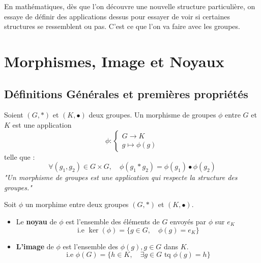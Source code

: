 
\minitoc  %

En mathématiques, dès que l'on découvre une nouvelle structure particulière, on essaye de définir des applications dessus 
pour essayer de voir si certaines structures se ressemblent ou pas. C'est ce que l'on va faire avec les groupes. 


\section{Morphismes, Image et Noyaux}

\subsection{Définitions Générales et premières propriétés}

\begin{definition}
    Soient $(G,\ast )$ et $(K,\bullet )$ deux groupes. 
    Un morphisme de groupes $\phi$ entre $G$ et $K$ est une application 
        \[ \phi : 
        \begin{cases}
            G \longrightarrow K \\ 
            g \longmapsto \phi(g)
        \end{cases} \] 
        telle que : 
        \[ \forall (g_1,g_2) \in G \times G, \quad \phi (g_1 \ast g_2) = \phi(g_1) \bullet \phi(g_2) \]
    \emph{"Un morphisme de groupes est une application qui respecte la structure des groupes."}
\end{definition}

\newpage 

\begin{definition}
    Soit $\phi$ un morphime entre deux groupes $(G,*)$ et $(K,\bullet)$. 
    \begin{itemize}
        \item Le \textbf{noyau} de $\phi$ est l'ensemble des éléments de $G$ envoyés par $\phi$ sur $e_{K}$ 
            \[ \text{i.e } \ker (\phi) = \{ g \in G, \quad  \phi(g) = e_{K} \} \] 
        \item \textbf{L'image} de $\phi$ est l'ensemble des $\phi(g), g \in G$ dans $K$. 
            \[ \text{i.e }  \phi(G) = \{ h \in K, \quad \exists g \in G \text{ tq } \phi(g) = h \} \] 
    \end{itemize}
\end{definition}

